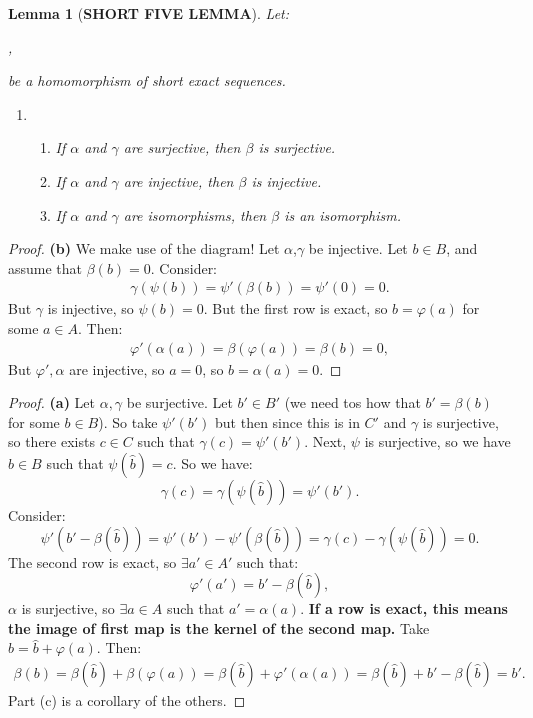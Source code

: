 \documentclass[9pt,reqno,twoside]{amsbook}
\theoremstyle{plain}
\numberwithin{section}{chapter}
\numberwithin{equation}{chapter}
\newtheorem{lem}[theorem]{Lemma}
\theoremstyle{definition}
\theoremstyle{remark}
\theoremstyle{plain}
\newcommand{\bee}{\begin{equation}\begin{aligned}}
\newcommand{\eee}{\end{aligned}\end{equation}}
\renewcommand{\phi}{\varphi}
\begin{document}
\begin{lem}[\textbf{SHORT FIVE LEMMA}]
Let:
\begin{center}
,
\end{center}
be a homomorphism of short exact sequences. 
\begin{enumerate}[]
\item[]
\begin{enumerate}
\item If $\alpha$ and $\gamma$ are surjective, then $\beta$ is surjective. 
\item If $\alpha$ and $\gamma$ are injective, then $\beta$ is injective. 
\item If $\alpha$ and $\gamma$ are isomorphisms, then $\beta$ is an isomorphism. 
\end{enumerate}
\end{enumerate}
\end{lem}

\begin{proof} 
\textbf{(b)} We make use of the diagram! Let $\alpha$,$\gamma$ be injective. Let $b \in B$, and assume that $\beta(b) = 0$. Consider:
\bee 
\gamma(\psi(b)) = \psi'(\beta(b)) = \psi'(0) = 0.
 \eee 
 But $\gamma$ is injective, so $\psi(b) = 0$. But the first row is exact, so $b = \phi(a)$ for some $a \in A$. Then:
 \bee 
 \phi'(\alpha(a)) = \beta(\phi(a)) = \beta(b) = 0,
  \eee 
  But $\phi',\alpha$ are injective, so $a = 0$, so $b = \alpha(a) = 0$. 
\end{proof}

\begin{proof} \textbf{(a)}
Let $\alpha,\gamma$ be surjective. Let $b' \in B'$ (we need tos how that $b' = \beta(b)$ for some $b \in B$). So take $\psi'(b')$ but then since this is in $C'$ and $\gamma$ is surjective, so there exists $c \in C$ such that $\gamma(c) = \psi'(b')$. Next, $\psi$ is surjective, so we have $\hat{b} \in B$ such that $\psi(\hat{b}) = c$. So we have: 
$$
\gamma(c) = \gamma(\psi(\hat{b})) = \psi'(b').
$$
Consider: 
$$
\psi'(b' - \beta(\hat{b})) = \psi'(b') - \psi'(\beta(\hat{b})) = \gamma(c) - \gamma(\psi(\hat{b})) = 0.
$$
The second row is exact, so $\exists a' \in A'$ such that:
$$
\phi'(a') = b' - \beta(\hat{b}),
$$
$\alpha$ is surjective, so $\exists a \in A$ such that $a' = \alpha(a)$. 
\textbf{If a row is exact, this means the image of first map is the kernel of the second map. } Take $b = \hat{b} + \phi(a)$. Then:
\bee 
\beta(b) = \beta(\hat{b}) + \beta(\phi(a)) = \beta(\hat{b}) +  \phi'(\alpha(a)) = \beta(\hat{b}) + b' - \beta(\hat{b}) = b'. 
\eee 
Part (c) is a corollary of the others. 
\end{proof}
\end{document}
